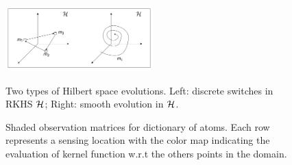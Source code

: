 \begin{figure}
\centering
\begin{minipage}{0.45\textwidth}
\centering
\includegraphics[height=1.0in]{figures/model.png}
\caption{\small{Two types of Hilbert space evolutions. Left: discrete switches in RKHS $\mathcal{H}$; Right: smooth evolution in $\mathcal{H}$.}}
\label{fig:hilbert_evolution}           
\end{minipage}\hfill
\begin{minipage}{0.45\textwidth}
\centering
{}
\caption{\small{Shaded observation matrices for dictionary of atoms. Each row represents a sensing location with the color map indicating the evaluation of kernel function w.r.t the others points in the domain.}}
\label{fig:shaded}
\end{minipage}
\end{figure}

